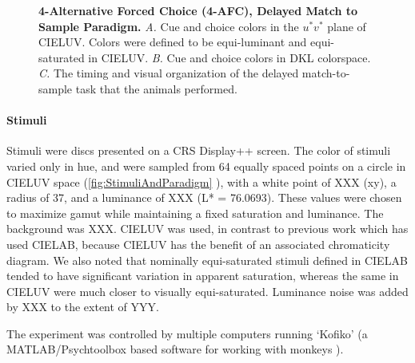 \begin{figure}

\caption{\textbf{4-Alternative Forced Choice (4-AFC), Delayed Match to Sample Paradigm.}
\emph{A.} Cue and choice colors in the $u^*v^*$ plane of CIELUV. Colors were defined to be equi-luminant and equi-saturated in CIELUV.
\emph{B.} Cue and choice colors in DKL colorspace.
\emph{C.} The timing and visual organization of the delayed match-to-sample task that the animals performed.
} 
\label{fig:StimuliAndParadigm}
\end{figure}

\paragraph{Stimuli} 

Stimuli were discs presented on a CRS Display++ screen.
The color of stimuli varied only in hue, and were sampled from 64 equally spaced points on a circle in CIELUV space (\autoref{fig:StimuliAndParadigm}%
), with a white point of XXX (xy), a radius of 37, and a luminance of XXX (L* = 76.0693). 
These values were chosen to maximize gamut while maintaining a fixed saturation and luminance. 
The background was XXX.
CIELUV was used, in contrast to previous work which has used CIELAB, because CIELUV has the benefit of an associated chromaticity diagram. 
We also noted that nominally equi-saturated stimuli defined in CIELAB tended to have significant variation in apparent saturation, whereas the same in CIELUV were much closer to visually equi-saturated. 
Luminance noise was added by XXX to the extent of YYY.

The experiment was controlled by multiple computers running `Kofiko' (a MATLAB/Psychtoolbox based software for working with monkeys %
).

